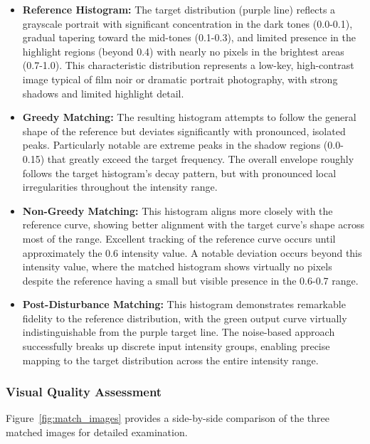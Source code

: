 \documentclass[12pt,a4paper]{article}
\begin{document}
\begin{itemize}
    \item \textbf{Reference Histogram:} The target distribution (purple line) reflects a grayscale portrait with significant concentration in the dark tones (0.0-0.1), gradual tapering toward the mid-tones (0.1-0.3), and limited presence in the highlight regions (beyond 0.4) with nearly no pixels in the brightest areas (0.7-1.0). This characteristic distribution represents a low-key, high-contrast image typical of film noir or dramatic portrait photography, with strong shadows and limited highlight detail.
    
    \item \textbf{Greedy Matching:} The resulting histogram attempts to follow the general shape of the reference but deviates significantly with pronounced, isolated peaks. Particularly notable are extreme peaks in the shadow regions (0.0-0.15) that greatly exceed the target frequency. The overall envelope roughly follows the target histogram's decay pattern, but with pronounced local irregularities throughout the intensity range. 
     
    \item \textbf{Non-Greedy Matching:} This histogram aligns more closely with the reference curve, showing better alignment with the target curve's shape across most of the range. Excellent tracking of the reference curve occurs until approximately the 0.6 intensity value. A notable deviation occurs beyond this intensity value, where the matched histogram shows virtually no pixels despite the reference having a small but visible presence in the 0.6-0.7 range.
    
    \item \textbf{Post-Disturbance Matching:} This histogram demonstrates remarkable fidelity to the reference distribution, with the green output curve virtually indistinguishable from the purple target line. The noise-based approach successfully breaks up discrete input intensity groups, enabling precise mapping to the target distribution across the entire intensity range.
\end{itemize}

\subsubsection{Visual Quality Assessment}

Figure~\ref{fig:match_images} provides a side-by-side comparison of the three matched images for detailed examination.
\end{document}
